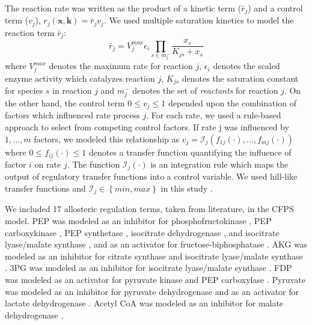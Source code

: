 \documentclass[12pt]{article}
\begin{document}
The reaction rate was written as the product of a kinetic term ($\bar{r}_{j}$) and a control term ($v_{j}$), $r_{j}\left(\mathbf{x},\mathbf{k}\right)=\bar{r}_{j}v_{j}$.
We used multiple saturation kinetics to model the reaction term $\bar{r}_{j}$:
\begin{equation}\label{eqn:rate-bar}
	\bar{r}_{j}=V_{j}^{max}\epsilon_{i}\prod_{s\in{m_{j}^{-}}}\frac{x_{s}}{K_{js} + x_{s}}
\end{equation}
where $V_{j}^{max}$ denotes the maximum rate for reaction $j$, $\epsilon_{i}$ denotes the scaled enzyme activity which catalyzes reaction $j$,
$K_{js}$ denotes the saturation constant for species $s$ in reaction $j$ and $m_{j}^{-}$ denotes the set of \textit{reactants} for reaction $j$.
On the other hand, the control term $0\leq v_{j}\leq 1$ depended upon the combination of factors which influenced rate process $j$.
For each rate, we used a rule-based approach to select from competing control factors.
If rate j was influenced by $1,\dots,m$ factors, we modeled this relationship as
$v_{j}=\mathcal{I}_{j}\left(f_{1j}\left(\cdot\right),\hdots,f_{mj}\left(\cdot\right)\right)$
where $0\leq f_{ij}\left(\cdot\right)\leq 1$ denotes a transfer function quantifying the influence of factor $i$ on rate $j$.
The function $\mathcal{I}_{j}\left(\cdot\right)$ is an integration rule which maps the output of regulatory transfer functions into a control
variable. We used hill-like transfer functions and $\mathcal{I}_{j}\in\left\{min,max\right\}$ in this study \cite{pr3010138}.

We included 17 allosteric regulation terms, taken from literature, in the CFPS model.
PEP was modeled as an inhibitor for phosphofructokinase \cite{2010_kotte_MolSystBiol,2011_cabrera_JBiolChem}, PEP carboxykinase \cite{2010_kotte_MolSystBiol}, PEP synthetase \cite{2010_kotte_MolSystBiol,1973_chulavatnatol_JBiolChem}, isocitrate dehydrogenase \cite{2010_kotte_MolSystBiol,2007_ogawa_JBacteriol}, and isocitrate lyase/malate synthase \cite{2010_kotte_MolSystBiol,2007_ogawa_JBacteriol,1988_mackintosh_BiochemJ}, and as an activator for fructose-biphosphatase \cite{2010_kotte_MolSystBiol,2000_donahue_JBacteriol,2006_hines_JBiolChem,2007_hines_JBiolChem}.
AKG was modeled as an inhibitor for citrate synthase \cite{2010_kotte_MolSystBiol,1994_pereira_JBiolChem,1983_robinson_FEBSLett} and isocitrate lyase/malate synthase \cite{2010_kotte_MolSystBiol,1988_mackintosh_BiochemJ}.
3PG was modeled as an inhibitor for isocitrate lyase/malate synthase \cite{2010_kotte_MolSystBiol,1988_mackintosh_BiochemJ}.
FDP was modeled as an activator for pyruvate kinase \cite{2010_kotte_MolSystBiol,2010_zhu_Biochimie} and PEP carboxylase \cite{2010_kotte_MolSystBiol,1972_wohl_JBiolChem}.
Pyruvate was modeled as an inhibitor for pyruvate dehydrogenase \cite{2010_kotte_MolSystBiol,2007_kale_JBiolChem,2002_arjunan_Biochemistry} and as an activator for lactate dehydrogenase \cite{2008_okino_ApplMicrobiolBiotechnol}.
Acetyl CoA was modeled as an inhibitor for malate dehydrogenase \cite{2010_kotte_MolSystBiol}.
\end{document}
